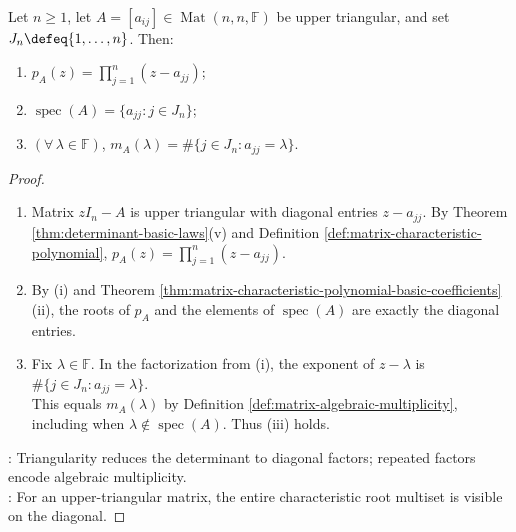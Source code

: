 \begin{proposition} \label{prop:upper-triangular-characteristic-polynomial} \\
Let $n\geq1$, let $A=[a_{ij}]\in\operatorname{Mat}(n,n,\mathbb{F})$ be upper triangular, and set $J_n\defeq\{1,\ldots,n\}$. Then:
\begin{enumerate}[label=(\roman*)]
\setlength{\itemsep}{0pt}
\item $p_A(z)=\prod\limits_{j=1}^{n}(z-a_{jj})$;
\item $\operatorname{spec}(A)=\{a_{jj}:j\in J_n\}$;
\item $(\forall\,\lambda\in\mathbb{F})$, $m_A(\lambda)=\#\{j\in J_n:a_{jj}=\lambda\}$.
\end{enumerate}
\begin{proof}
\begin{enumerate}[label=(\roman*)]
\setlength{\itemsep}{0pt}
\item Matrix $zI_n-A$ is upper triangular with diagonal entries $z-a_{jj}$. By Theorem \ref{thm:determinant-basic-laws}(v) and Definition \ref{def:matrix-characteristic-polynomial}, $p_A(z)=\prod\limits_{j=1}^{n}(z-a_{jj})$.
\item By (i) and Theorem \ref{thm:matrix-characteristic-polynomial-basic-coefficients}(ii), the roots of $p_A$ and the elements of $\operatorname{spec}(A)$ are exactly the diagonal entries.
\item Fix $\lambda\in\mathbb{F}$. In the factorization from (i), the exponent of $z-\lambda$ is $\#\{j\in J_n:a_{jj}=\lambda\}$.\\
This equals $m_A(\lambda)$ by Definition \ref{def:matrix-algebraic-multiplicity}, including when $\lambda\notin\operatorname{spec}(A)$. Thus (iii) holds.
\end{enumerate}
: Triangularity reduces the determinant to diagonal factors; repeated factors encode algebraic multiplicity.\\
: For an upper-triangular matrix, the entire characteristic root multiset is visible on the diagonal.
\end{proof}
\end{proposition}

